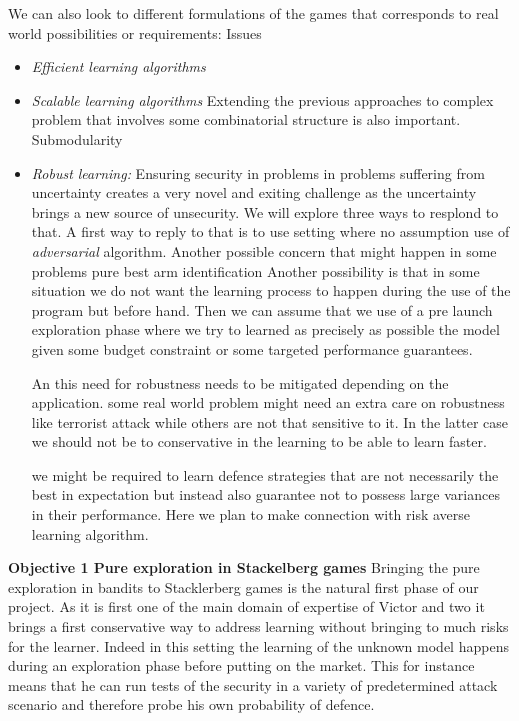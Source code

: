 We can also look to different formulations of the games that corresponds to real world possibilities or requirements:
Issues
\begin{itemize}
\item \textit{Efficient learning algorithms}
\item \textit{Scalable learning algorithms} Extending the previous approaches to complex problem that involves some combinatorial structure is also important. Submodularity
\item \textit{Robust learning:} Ensuring security in problems in problems suffering from uncertainty creates a very novel and exiting challenge as the uncertainty brings a new source of unsecurity. We will explore three ways to resplond to that.
A first way to  reply to that is to use setting where no assumption use of \textit{adversarial} algorithm.
 Another possible concern that might happen in some problems pure best arm identification 
 Another possibility is that in some situation we do not want the learning process to happen during the use of the program but before hand. Then we can assume that we use of a pre launch exploration phase where we try to learned as precisely as possible the model given some budget constraint or some targeted performance guarantees. 
  
 An
this need for robustness needs to be mitigated depending on the application. some real world problem might need an extra care on robustness like terrorist attack while others are not that sensitive to it.
 In the latter case we should not be to conservative in the learning to be able to learn faster.

 we might be required to learn defence strategies that are not necessarily the best in expectation but instead also guarantee not to possess large variances in their performance. Here we plan to make connection with risk averse learning algorithm.
\end{itemize}


\textbf{Objective 1 Pure exploration in Stackelberg games}
Bringing the pure exploration in bandits to Stacklerberg games is the natural first phase of our project. As it is first one of the main domain of expertise of Victor and two it brings a first conservative way to address learning without bringing to much risks for the learner. Indeed in this setting the learning of the unknown model happens during an exploration phase before putting on the market.  This for instance means that he can run tests of the security in a variety of predetermined attack scenario and therefore  probe his own probability of defence.

